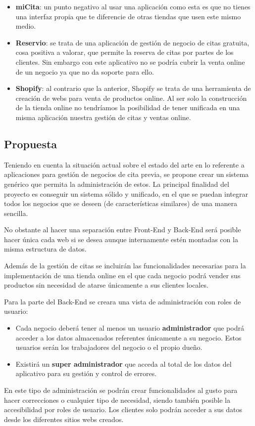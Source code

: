 \begin{itemize}
    \item \textbf{miCita}: un punto negativo al usar una aplicación como esta es que no tienes una interfaz propia
    que te diferencie de otras tiendas que usen este mismo medio.

    \item \textbf{Reservio}: se trata de una aplicación de gestión de negocio de citas gratuita, cosa positiva a
    valorar, que permite la reserva de citas por partes de los clientes. Sin embargo con este aplicativo no se
    podría cubrir la venta online de un negocio ya que no da soporte para ello.

    \item \textbf{Shopify}: al contrario que la anterior, Shopify se trata de una herramienta de creación de webs
    para venta de productos online. Al ser solo la construcción de la tienda online no tendríamos la posibilidad de
    tener unificada en una misma aplicación nuestra gestión de citas y ventas online.
\end{itemize}

\subsection{Propuesta}
Teniendo en cuenta la situación actual sobre el estado del arte en lo referente a aplicaciones para
gestión de negocios de cita previa, se propone crear un sistema genérico que permita la administración
de estos. La principal finalidad del proyecto es conseguir un sistema sólido y unificado, en el que se
puedan integrar todos los negocios que se deseen (de características similares) de una manera sencilla.

No obstante al hacer una separación entre Front-End y Back-End será posible hacer única cada web si se
desea aunque internamente estén montadas con la misma estructura de datos.

Además de la gestión de citas se incluirán las funcionalidades necesarias para la implementación de una
tienda online en el que cada negocio podrá vender sus productos sin necesidad de atarse únicamente
a sus clientes locales.

Para la parte del Back-End se creara una vista de administración con roles de usuario:

\vspace{-0.5em}
\begin{itemize}
    \item Cada negocio deberá tener al menos un usuario \textbf{administrador} que podrá acceder a los datos
    almacenados referentes únicamente a su negocio. Estos usuarios serán los trabajadores del negocio o el propio
    dueño.

    \item Existirá un \textbf{super administrador} que acceda al total de los datos del aplicativo
    para su gestión y control de errores.
\end{itemize}

En este tipo de administración se podrán crear funcionalidades al gusto para hacer correcciones o
cualquier tipo de necesidad, siendo también posible la accesibilidad por roles de usuario.
Los clientes solo podrán acceder a sus datos desde los diferentes sitios webs creados.